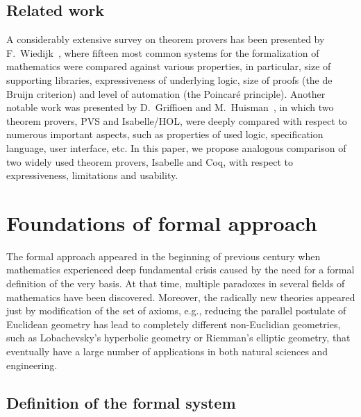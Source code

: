\documentclass[article]{aaltoseries}
\begin{document}


\subsection{Related work}
A considerably extensive survey on theorem provers has been presented by F.~Wiedijk~\cite{Wie03}, where fifteen most common systems for the formalization of mathematics were compared against various properties, in particular, size of supporting libraries, expressiveness of underlying logic, size of proofs (the de Bruijn criterion) and level of automation (the Poincaré principle). 
Another notable work was presented by D.~Griffioen and M.~Huisman~\cite{Griff98}, in which two theorem provers, PVS and Isabelle/HOL, were deeply compared with respect to numerous important aspects, such as properties of used logic, specification language, user interface, etc. In this paper, we propose analogous comparison of two widely used theorem provers, Isabelle and Coq, with respect to expressiveness, limitations and usability.




\section{Foundations of formal approach}
\label{sec:formal_theory}

The formal approach appeared in the beginning of previous century when mathematics experienced deep fundamental crisis caused by the need for a formal definition of the very basis. At that time, multiple paradoxes in several fields of mathematics have been discovered. Moreover, the radically new theories appeared just by modification of the set of axioms, e.g., reducing the parallel postulate of Euclidean geometry has lead to completely different non-Euclidian geometries, such as Lobachevsky's hyperbolic geometry or Riemman's elliptic geometry, that eventually have a large number of applications in both natural sciences and engineering.


\subsection{Definition of the formal system}
\label{sec:definitions}

\end{document}
